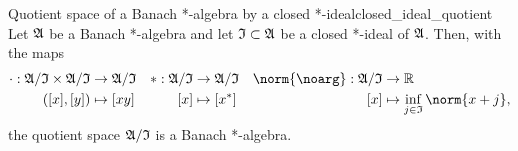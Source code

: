 \begin{theorem}{Quotient space of a Banach *-algebra by a closed *-ideal}{closed_ideal_quotient}
    Let \(\mathfrak{A}\) be a Banach *-algebra and let \(\mathfrak{I}\subset \mathfrak{A}\) be a closed *-ideal of \(\mathfrak{A}\). Then, with the maps
    \begin{align*}
        \cdot : \algebra{A}/\algebra{I} \times \algebra{A}/\algebra{I} &\to \algebra{A}/\algebra{I}&
        * : \algebra{A}/\algebra{I} &\to \algebra{A}/\algebra{I}&
        \norm{\noarg} : \algebra{A}/\algebra{I} &\to \mathbb{R}\\
        ([x],[y]) &\mapsto [xy]&
        [x] &\mapsto [x^*]&
        [x] &\mapsto \inf_{j \in \algebra{I}}{\norm{x + j}},
    \end{align*}
    the quotient space \(\mathfrak{A}/\mathfrak{I}\) is a Banach *-algebra.
\end{theorem}

